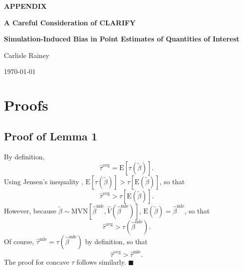 \documentclass[12pt]{article}
\newenvironment{proof}[1][Proof]{\begin{trivlist}
\item[\hskip \labelsep {\bfseries #1}]}{\end{trivlist}}
\begin{document}
\begin{center}

{\Large \textbf{APPENDIX}}

\vspace{0.2cm}

{\Large \textbf{A Careful Consideration of CLARIFY}}

\vspace{0.2cm}

{\textbf{Simulation-Induced Bias in Point Estimates of Quantities of Interest}}

\vspace{1cm}

Carlisle Rainey

\vspace{1cm}
\today
\end{center}
\vspace{5mm}

\appendix

\section{Proofs}\label{appendix:proofs}

\subsection{Proof of Lemma 1}

\begin{proof}
By definition, $$ \hat{\tau}^{\text{avg}} = \text{E}\left[ \tau \left(\tilde{\beta} \right) \right].$$
Using Jensen's inequality \citep[p.\@ 190, Thm.\@ 4.7.7]{CasellaBerger2002}, $\text{E}\left[ \tau \left(\tilde{\beta} \right) \right] > \tau \left[ \text{E}\left( \tilde{\beta} \right) \right]$, so that $$\hat{\tau}^{\text{avg}} > \tau \left[ \text{E}\left( \tilde{\beta} \right) \right].$$
However, because $\tilde{\beta} \sim \text{MVN} \left[ \hat{\beta}^{\text{mle}}, \hat{V} \left( \hat{\beta}^{\text{mle}} \right) \right]$, $\text{E}\left( \tilde{\beta} \right) = \hat{\beta}^\text{mle}$, so that
$$\hat{\tau}^{\text{avg}} > \tau \left( \hat{\beta}^\text{mle}\right).$$
Of course, $\hat{\tau}^\text{mle} = \tau \left( {\hat{\beta}^\text{mle}} \right)$ by definition, so that $$\hat{\tau}^{\text{avg}} > \hat{\tau}^\text{mle}.$$
The proof for concave $\tau$ follows similarly.
 $\blacksquare$
\end{proof}
\end{document}
